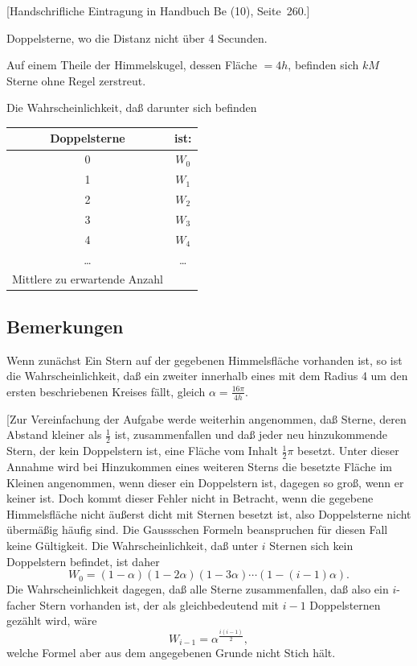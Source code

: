 \documentclass[12pt,a4paper]{article}
\theoremstyle{plain}
\theoremstyle{definition}
\theoremstyle{remark}
\begin{document}
[Handschrifliche Eintragung in Handbuch Be (10), Seite~260.]

Doppelsterne, wo die Distanz nicht \"uber 4 Secunden.

Auf einem Theile der Himmelskugel, dessen Fl\"ache $= 4h$, befinden sich $kM$ Sterne ohne Regel zerstreut.

Die Wahrscheinlichkeit, da\ss{} darunter sich befinden

\begin{center}
\begin{tabular}{c|c}
Doppelsterne & ist: \\
\hline
0 & $W_0$ \\
1 & $W_1$ \\
2 & $W_2$ \\
3 & $W_3$ \\
4 & $W_4$ \\
\ldots & \ldots \\
Mittlere zu erwartende Anzahl &
\end{tabular}
\end{center}

\subsection*{Bemerkungen}

Wenn zun\"achst Ein Stern auf der gegebenen Himmelsfl\"ache vorhanden ist, so ist die Wahrscheinlichkeit, da\ss{} ein zweiter innerhalb eines mit dem Radius 4 um den ersten beschriebenen Kreises f\"allt, gleich $\alpha = \tfrac{16\pi}{4h}$.

[Zur Vereinfachung der Aufgabe werde weiterhin angenommen, da\ss{} Sterne, deren Abstand kleiner als $\tfrac{1}{2}$ ist, zusammenfallen und da\ss{} jeder neu hinzukommende Stern, der kein Doppelstern ist, eine Fl\"ache vom Inhalt $\tfrac{1}{2}\pi$ besetzt. Unter dieser Annahme wird bei Hinzukommen eines weiteren Sterns die besetzte Fl\"ache im Kleinen angenommen, wenn dieser ein Doppelstern ist, dagegen so gro\ss, wenn er keiner ist. Doch kommt dieser Fehler nicht in Betracht, wenn die gegebene Himmelsfl\"ache nicht \"au\ss erst dicht mit Sternen besetzt ist, also Doppelsterne nicht \"uberm\"a\ss ig h\"aufig sind. Die Gaussschen Formeln beanspruchen f\"ur diesen Fall keine G\"ultigkeit. Die Wahrscheinlichkeit, da\ss{} unter $i$ Sternen sich kein Doppelstern befindet, ist daher
\[
W_0 = (1 - \alpha)(1 - 2\alpha)(1 - 3\alpha) \cdots (1 - (i-1)\alpha).
\]
Die Wahrscheinlichkeit dagegen, da\ss{} alle Sterne zusammenfallen, da\ss{} also ein $i$-facher Stern vorhanden ist, der als gleichbedeutend mit $i-1$ Doppelsternen gez\"ahlt wird, w\"are
\[
W_{i-1} = \alpha^{\frac{i(i-1)}{2}},
\]
welche Formel aber aus dem angegebenen Grunde nicht Stich h\"alt.
\end{document}
